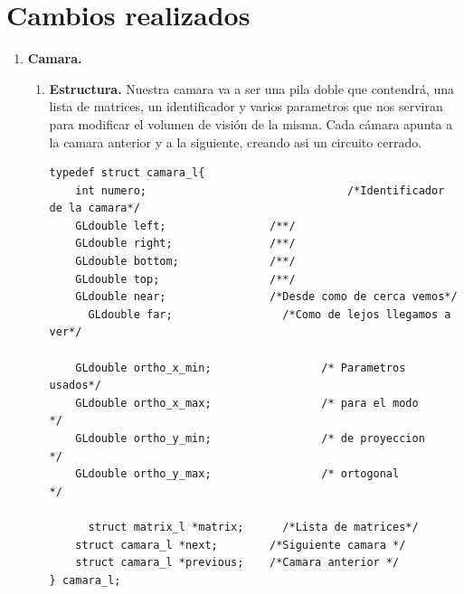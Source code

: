 \documentclass[12pt,a4paper]{article}
\begin{document}
\section{Cambios realizados}

\begin{enumerate}
\item \textbf{Camara.}\newline

\begin{enumerate}
\item \textbf{Estructura.}
Nuestra camara va a ser una pila doble que contendrá, una lista de matrices, un identificador y varios parametros que nos serviran para modificar el volumen de visión de la misma.\newline
Cada cámara apunta a la camara anterior y a la siguiente, creando asi un circuito cerrado.\newline
\begin{lstlisting}
typedef struct camara_l{
    int numero;							      /*Identificador de la camara*/
    GLdouble left;                /**/
    GLdouble right;               /**/
    GLdouble bottom;              /**/
    GLdouble top;                 /**/
    GLdouble near;                /*Desde como de cerca vemos*/
	  GLdouble far;                 /*Como de lejos llegamos a ver*/

  	GLdouble ortho_x_min;				  /* Parametros usados*/
  	GLdouble ortho_x_max;				  /* para el modo     */
  	GLdouble ortho_y_min;				  /* de proyeccion    */
  	GLdouble ortho_y_max;				  /* ortogonal        */

	  struct matrix_l *matrix;      /*Lista de matrices*/
    struct camara_l *next;        /*Siguiente camara */
    struct camara_l *previous;    /*Camara anterior */
} camara_l;
\end{lstlisting}


\end{enumerate}
\end{enumerate}
\end{document}
